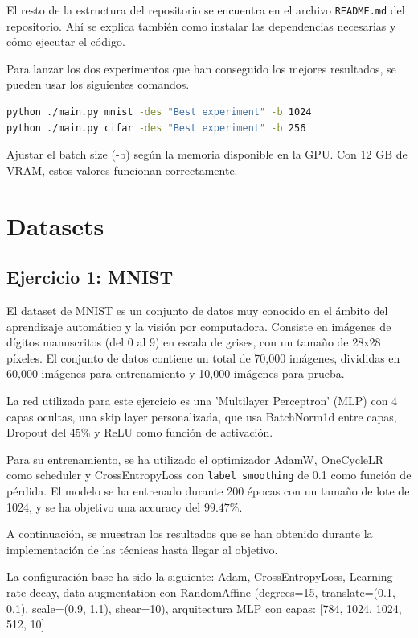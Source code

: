 \documentclass[11pt,spanish,listoffigures,listoftables]{tfgetsinf}
\begin{document}
El resto de la estructura del repositorio se encuentra en el archivo \texttt{README.md} del repositorio. Ahí se explica también como instalar las dependencias necesarias y cómo ejecutar el código.

Para lanzar los dos experimentos que han conseguido los mejores resultados, se pueden usar los siguientes comandos.
\begin{lstlisting}[language=Bash]
python ./main.py mnist -des "Best experiment" -b 1024
python ./main.py cifar -des "Best experiment" -b 256
\end{lstlisting}

Ajustar el batch size (-b) según la memoria disponible en la GPU. Con 12 GB de VRAM, estos valores funcionan correctamente.

\chapter{Datasets}
\section{Ejercicio 1: MNIST}
El dataset de MNIST es un conjunto de datos muy conocido en el ámbito del aprendizaje automático y la visión por computadora. Consiste en imágenes de dígitos manuscritos (del 0 al 9) en escala de grises, con un tamaño de 28x28 píxeles. El conjunto de datos contiene un total de 70,000 imágenes, divididas en 60,000 imágenes para entrenamiento y 10,000 imágenes para prueba.

La red utilizada para este ejercicio es una 'Multilayer Perceptron' (MLP) con 4 capas ocultas, una skip layer personalizada, que usa BatchNorm1d entre capas, Dropout del 45\% y ReLU como función de activación.

Para su entrenamiento, se ha utilizado el optimizador AdamW, OneCycleLR como scheduler y CrossEntropyLoss con \texttt{label smoothing} de 0.1 como función de pérdida. El modelo se ha entrenado durante 200 épocas con un tamaño de lote de 1024, y se ha objetivo una accuracy del $99.47\%$.

A continuación, se muestran los resultados que se han obtenido durante la implementación de las técnicas hasta llegar al objetivo.

La configuración base ha sido la siguiente: Adam, CrossEntropyLoss, Learning rate decay, data augmentation con RandomAffine (degrees=15, translate=(0.1, 0.1), scale=(0.9, 1.1), shear=10), arquitectura MLP con capas: [784, 1024, 1024, 512, 10]
\end{document}
